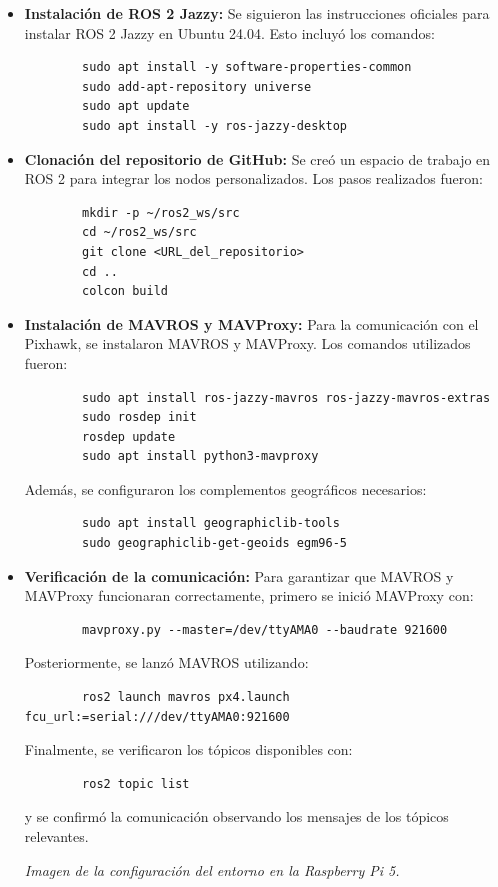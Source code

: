 \begin{itemize}
        \item \textbf{Instalación de ROS 2 Jazzy:} 
        Se siguieron las instrucciones oficiales para instalar ROS 2 Jazzy en Ubuntu 24.04. Esto incluyó los comandos:
        \begin{verbatim}
        sudo apt install -y software-properties-common
        sudo add-apt-repository universe
        sudo apt update
        sudo apt install -y ros-jazzy-desktop
        \end{verbatim}
    
        \item \textbf{Clonación del repositorio de GitHub:} 
        Se creó un espacio de trabajo en ROS 2 para integrar los nodos personalizados. Los pasos realizados fueron:
        \begin{verbatim}
        mkdir -p ~/ros2_ws/src
        cd ~/ros2_ws/src
        git clone <URL_del_repositorio>
        cd ..
        colcon build
        \end{verbatim}
    
        \item \textbf{Instalación de MAVROS y MAVProxy:} 
        Para la comunicación con el Pixhawk, se instalaron MAVROS y MAVProxy. Los comandos utilizados fueron:
        \begin{verbatim}
        sudo apt install ros-jazzy-mavros ros-jazzy-mavros-extras
        sudo rosdep init
        rosdep update
        sudo apt install python3-mavproxy
        \end{verbatim}
        Además, se configuraron los complementos geográficos necesarios:
        \begin{verbatim}
        sudo apt install geographiclib-tools
        sudo geographiclib-get-geoids egm96-5
        \end{verbatim}
    
        \item \textbf{Verificación de la comunicación:} 
        Para garantizar que MAVROS y MAVProxy funcionaran correctamente, primero se inició MAVProxy con:
        \begin{verbatim}
        mavproxy.py --master=/dev/ttyAMA0 --baudrate 921600
        \end{verbatim}
        Posteriormente, se lanzó MAVROS utilizando:
        \begin{verbatim}
        ros2 launch mavros px4.launch fcu_url:=serial:///dev/ttyAMA0:921600
        \end{verbatim}
        Finalmente, se verificaron los tópicos disponibles con:
        \begin{verbatim}
        ros2 topic list
        \end{verbatim}
        y se confirmó la comunicación observando los mensajes de los tópicos relevantes.
        
        \begin{center} 
            \textit{Imagen de la configuración del entorno en la Raspberry Pi 5.} 
        \end{center}
    \end{itemize}
    
